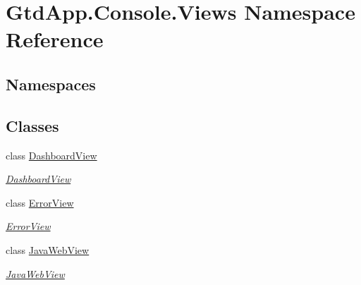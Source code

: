 \hypertarget{namespace_gtd_app_1_1_console_1_1_views}{}\section{Gtd\+App.\+Console.\+Views Namespace Reference}
\label{namespace_gtd_app_1_1_console_1_1_views}
\subsection*{Namespaces}
\begin{DoxyCompactItemize}
\end{DoxyCompactItemize}
\subsection*{Classes}
\begin{DoxyCompactItemize}
\item 
class \mbox{\hyperlink{class_gtd_app_1_1_console_1_1_views_1_1_dashboard_view}{Dashboard\+View}}
\begin{DoxyCompactList}\small\item\em \mbox{\hyperlink{class_gtd_app_1_1_console_1_1_views_1_1_dashboard_view}{Dashboard\+View}} \end{DoxyCompactList}\item 
class \mbox{\hyperlink{class_gtd_app_1_1_console_1_1_views_1_1_error_view}{Error\+View}}
\begin{DoxyCompactList}\small\item\em \mbox{\hyperlink{class_gtd_app_1_1_console_1_1_views_1_1_error_view}{Error\+View}} \end{DoxyCompactList}\item 
class \mbox{\hyperlink{class_gtd_app_1_1_console_1_1_views_1_1_java_web_view}{Java\+Web\+View}}
\begin{DoxyCompactList}\small\item\em \mbox{\hyperlink{class_gtd_app_1_1_console_1_1_views_1_1_java_web_view}{Java\+Web\+View}} \end{DoxyCompactList}\end{DoxyCompactItemize}

